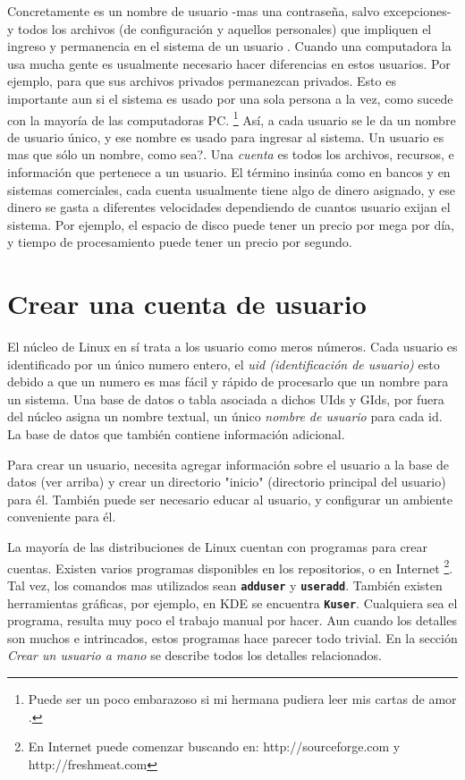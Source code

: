 Concretamente es un nombre de usuario -mas una contraseña, salvo
excepciones- y todos los archivos (de configuración y aquellos personales) que
impliquen el ingreso y permanencia en el sistema  de un usuario .
Cuando una computadora la usa mucha gente es usualmente necesario hacer
diferencias en estos usuarios. Por ejemplo, para que sus archivos privados
permanezcan privados. Esto es importante aun si el sistema es usado por una
sola persona a la vez, como sucede con la mayoría de las computadoras PC.
		\footnote{
 Puede ser un poco embarazoso si mi hermana pudiera leer mis cartas de amor
		.} Así, a cada
		usuario se le da un nombre de usuario único, y ese nombre es
		usado para ingresar al sistema. Un usuario es mas
		que sólo un nombre, como sea?. Una \textit{cuenta}
		es todos los archivos, recursos, e información que pertenece a
		un usuario. El término insinúa como en bancos y en sistemas
		comerciales, cada cuenta usualmente tiene algo de dinero
		asignado, y ese dinero se gasta a diferentes velocidades
		dependiendo de cuantos usuario exijan el sistema. Por ejemplo,
		el espacio de disco puede tener un precio por mega por día, y
		tiempo de procesamiento puede tener un precio por
		segundo.






\section{ Crear una cuenta de usuario}

El núcleo de Linux en sí trata a los usuario como meros números. Cada
usuario es identificado por un único numero entero, el  \textit{uid
(identificación de usuario)} esto debido a que un numero es mas fácil
y rápido de procesarlo que un nombre para un sistema. Una base de datos o tabla
asociada a dichos UIds y GIds, por fuera del núcleo asigna un nombre textual, un
único \textit{nombre de usuario} para cada id. La base de datos
que también contiene información adicional. 

Para crear un usuario, necesita agregar información sobre el usuario a la
base de datos (ver arriba) y crear un directorio "inicio" (directorio principal
del usuario) para él. También puede ser necesario educar al usuario, y
configurar un ambiente conveniente para él.

La mayoría de las distribuciones de Linux cuentan con programas para crear
cuentas. Existen varios programas disponibles en los repositorios,
o en Internet
	\footnote{En Internet puede comenzar buscando en:
	http://sourceforge.com y http://freshmeat.com}. Tal vez,
los comandos mas utilizados sean \texttt{\textbf{adduser}} y
\texttt{\textbf{useradd}}. También existen herramientas gráficas, por ejemplo,
en KDE se encuentra \texttt{\textbf{Kuser}}.
Cualquiera sea 
el programa, resulta muy poco el trabajo manual por hacer. Aun
cuando los detalles son muchos e intrincados, estos programas hace parecer todo
trivial. En la sección \textit{Crear un usuario a mano} se describe
todos los detalles relacionados.





